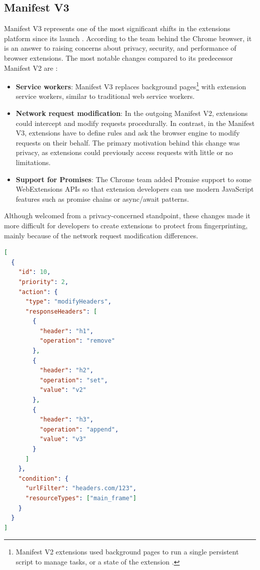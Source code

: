 \subsection{Manifest V3}
\label{Section:ManifestV3}

Manifest V3 represents one of the most significant shifts in the extensions platform since its launch \cite{ChromeManifestV3}. According to the team behind the Chrome browser, it is an answer to raising concerns about privacy, security, and performance of browser extensions. The most notable changes compared to its predecessor Manifest V2 are \cite{ChromeManifestV3}:

\begin{itemize}
	\item \textbf{Service workers}: Manifest V3 replaces background pages\footnote{Manifest V2 extensions used background pages to run a single persistent script to manage tasks, or a state of the extension \cite{ChromeManifestV2}.} with extension service workers, similar to traditional web service workers.
	\item \textbf{Network request modification}: In the outgoing Manifest V2, extensions could intercept and modify requests procedurally. In contrast, in the Manifest V3, extensions have to define rules and ask the browser engine to modify requests on their behalf. The primary motivation behind this change was privacy, as extensions could previously access requests with little or no limitations.
	\item \textbf{Support for Promises}: The Chrome team added Promise support to some WebExtensions APIs so that extension developers can use modern JavaScript features such as promise chains or async/await patterns.
\end{itemize}

Although welcomed from a privacy-concerned standpoint, these changes made it more difficult for developers to create extensions to protect from fingerprinting, mainly because of the network request modification differences.

\bigbreak

\begin{lstlisting}[language={JSON},caption={An example of a declarative rule which modifies selected response headers \cite{ChromeManifestV3}.}, label={Listing:ManifestV3RuleExample}]
[
  {
    "id": 10,
    "priority": 2,
    "action": {
      "type": "modifyHeaders",
      "responseHeaders": [
        {
          "header": "h1",
          "operation": "remove"
        },
        {
          "header": "h2",
          "operation": "set",
          "value": "v2"
        },
        {
          "header": "h3",
          "operation": "append",
          "value": "v3"
        }
      ]
    },
    "condition": {
      "urlFilter": "headers.com/123",
      "resourceTypes": ["main_frame"]
    }
  }
]
\end{lstlisting}


